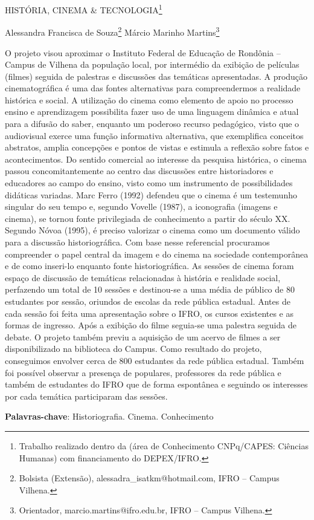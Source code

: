 \documentclass[article,12pt,onesidea,4paper,english,brazil]{abntex2}
\begin{document}
	
	
	\frenchspacing 
	
	\begin{center}
		\LARGE HISTÓRIA, CINEMA \& TECNOLOGIA\footnote{Trabalho realizado dentro da (área de Conhecimento CNPq/CAPES: Ciências Humanas) com financiamento do DEPEX/IFRO.}
		
		\normalsize
	Alessandra Francisca de Souza\footnote{Bolsista (Extensão), alessadra\_isatkm@hotmail.com, IFRO – Campus Vilhena.} 
	Márcio Marinho Martins\footnote{Orientador, marcio.martins@ifro.edu.br, IFRO – Campus Vilhena.}  
	\end{center}
	
	\noindent O projeto visou aproximar o Instituto Federal de Educação de Rondônia – Campus de Vilhena da população local, por intermédio da exibição de películas (filmes) seguida de palestras e discussões das temáticas apresentadas. A produção cinematográfica é uma das fontes alternativas para compreendermos a realidade histórica e social. A utilização do cinema como elemento de apoio no processo ensino e aprendizagem possibilita fazer uso de uma linguagem dinâmica e atual para a difusão do saber, enquanto um poderoso recurso pedagógico, visto que o audiovisual exerce uma função informativa alternativa, que exemplifica conceitos abstratos, amplia concepções e pontos de vistas e estimula a reflexão sobre fatos e acontecimentos. Do sentido comercial ao interesse da pesquisa histórica, o cinema passou concomitantemente ao centro das discussões entre historiadores e educadores ao campo do ensino, visto como um instrumento de possibilidades didáticas variadas. Marc Ferro (1992) defendeu que o cinema é um testemunho singular do seu tempo e, segundo Vovelle (1987), a iconografia (imagens e cinema), se tornou fonte privilegiada de conhecimento a partir do século XX. Segundo Nóvoa (1995), é preciso valorizar o cinema como um documento válido para a discussão historiográfica. Com base nesse referencial procuramos compreender o papel central da imagem e do cinema na sociedade contemporânea e de como inseri-lo enquanto fonte historiográfica. As sessões de cinema foram espaço de discussão de temáticas relacionadas à história e realidade social, perfazendo um total de 10 sessões e destinou-se a uma média de público de 80 estudantes por sessão, oriundos de escolas da rede pública estadual. Antes de cada sessão foi feita uma apresentação sobre o IFRO, os cursos existentes e as formas de ingresso. Após a exibição do filme seguia-se uma palestra seguida de debate. O projeto também previu a aquisição de um acervo de filmes a ser disponibilizado na biblioteca do Campus. Como resultado do projeto, conseguimos envolver cerca de 800 estudantes da rede pública estadual. Também foi possível observar a presença de populares, professores da rede pública e também de estudantes do IFRO que de forma espontânea e seguindo os interesses por cada temática participaram das sessões.
	
	\vspace{\onelineskip}
	
	\noindent
	\textbf{Palavras-chave}: Historiografia. Cinema. Conhecimento
	
\end{document}
